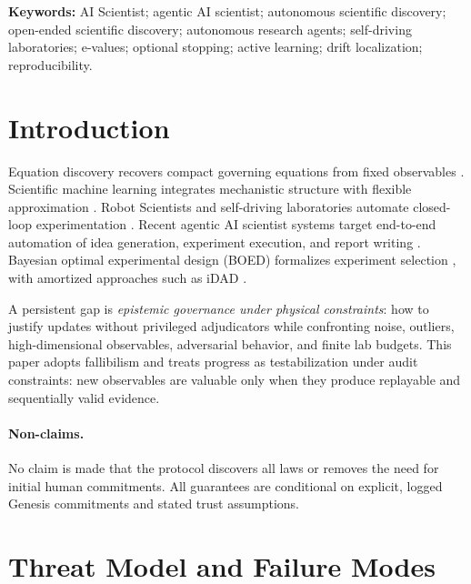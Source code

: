 \documentclass[11pt,a4paper]{article}
\begin{document}
\noindent\textbf{Keywords:} AI Scientist; agentic AI scientist; autonomous scientific discovery; open-ended scientific discovery; autonomous research agents; self-driving laboratories; e-values; optional stopping; active learning; drift localization; reproducibility.

\section{Introduction}

Equation discovery recovers compact governing equations from fixed observables \citep{SchmidtLipson2009,UdrescuTegmark2020,Brunton2016SINDy}.
Scientific machine learning integrates mechanistic structure with flexible approximation \citep{Raissi2019PINN,Karniadakis2021PIML,Cuomo2022PINNReview}.
Robot Scientists and self-driving laboratories automate closed-loop experimentation \citep{King2009Automation,Sparkes2010RobotScientists,Tom2024SDLchemrev,TobiasWahab2025SDLReview}.
Recent agentic AI scientist systems target end-to-end automation of idea generation, experiment execution, and report writing \citep{Lu2024AIScientist,Yamada2025AIScientistV2}.
Bayesian optimal experimental design (BOED) formalizes experiment selection \citep{Lindley1956,ChalonerVerdinelli1995,Foster2019vOED}, with amortized approaches such as iDAD \citep{Ivanova2021iDAD}.

A persistent gap is \emph{epistemic governance under physical constraints}: how to justify updates without privileged adjudicators while confronting noise, outliers, high-dimensional observables, adversarial behavior, and finite lab budgets.
This paper adopts fallibilism \citep{Popper1959,Quine1951} and treats progress as testabilization under audit constraints: new observables are valuable only when they produce replayable and sequentially valid evidence.

\paragraph{Non-claims.}
No claim is made that the protocol discovers all laws or removes the need for initial human commitments.
All guarantees are conditional on explicit, logged Genesis commitments and stated trust assumptions.

\section{Threat Model and Failure Modes}
\end{document}
